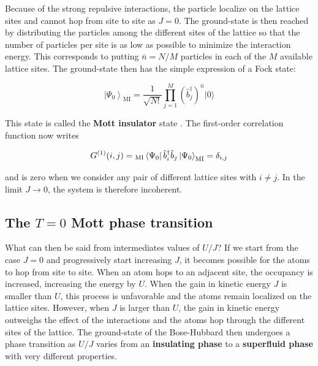 Because of the strong repulsive interactions, the particle localize on the lattice sites and cannot hop from site to site as $J=0$. The ground-state is then reached by distributing the particles among the different sites of the lattice so that the number of particles per site is as low as possible to minimize the interaction energy. This corresponds to putting $\bar{n}=N/M$ particles in each of the $M$ available lattice sites. The ground-state then has the simple expression of a Fock state:

\begin{equation}
    \left|\Psi_{0}\right\rangle_{\mathrm{MI}}=\frac{1}{\sqrt{N !}} \prod_{j=1}^{M}\left(\hat{b}_{j}^{\dagger}\right)^{\bar{n}}|0\rangle
    \label{eq:ground-state_MI}
\end{equation}

\noindent This state is called the \textbf{Mott insulator} state \cite{fisher1989boson}. The first-order correlation function now writes

\begin{equation}
     G^{(1)}(i,j)= {}_{\mathrm{MI}} \bra{\Psi_0} \hat{b}^{\dagger}_i \hat{b}_j \ket{\Psi_0}_{\mathrm{MI}} = \delta_{i,j}
\end{equation}

\noindent and is zero when we consider any pair of different lattice sites with $i \neq j$. In the limit $J \to 0$, the system is therefore incoherent.

\subsection{The $T=0$ Mott phase transition}

What can then be said from intermediates values of $U/J$? If we start from the case $J=0$ and progressively start increasing $J$, it becomes possible for the atoms to hop from site to site. When an atom hops to an adjacent site, the occupancy is increased, increasing the energy by $U$. When the gain in kinetic energy $J$ is smaller than $U$, this process is unfavorable and the atoms remain localized on the lattice sites. However, when $J$ is larger than $U$, the gain in kinetic energy outweighs the effect of the interactions and the atoms hop through the different sites of the lattice. The ground-state of the Bose-Hubbard then undergoes a phase transition as $U/J$ varies from an \textbf{insulating phase} to a \textbf{superfluid phase} with very different properties.

